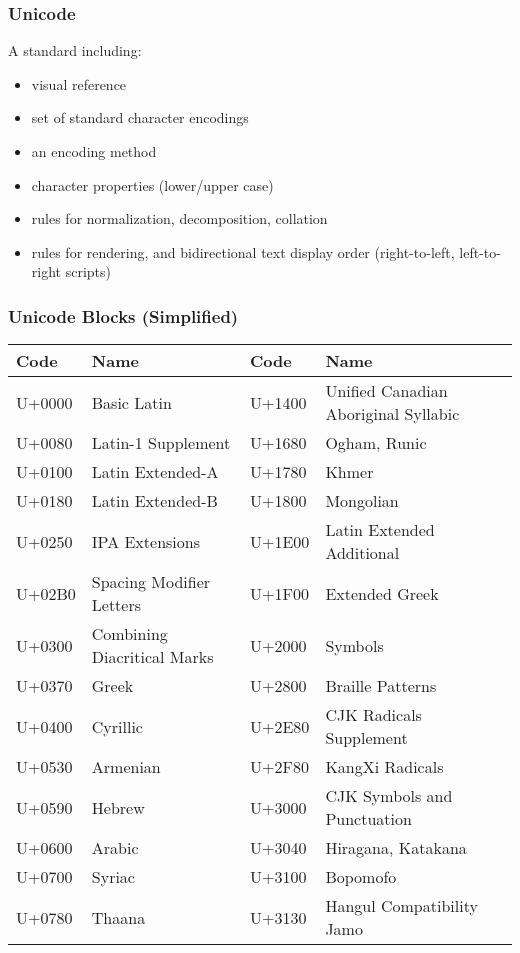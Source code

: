 \begin{frame}[fragile]
\frametitle{Unicode}
\color{structure}
A standard including:
\begin{itemize}\color{structure}
  \item visual reference
  \item set of standard character encodings
  \item an encoding method
  \item character properties (lower/upper case)
  \item rules for normalization, decomposition, collation
  \item rules for rendering, and bidirectional text display order (right-to-left, left-to-right scripts)
\end{itemize}
\end{frame}

\begin{frame}
\frametitle{Unicode Blocks (Simplified)}
\color{structure}
\begin{footnotesize}
\begin{table}
\begin{center}
\begin{tabular}{llll}
\hline
\textbf{Code}& \textbf{Name}& \textbf{Code}& \textbf{Name} \\
\hline
U+0000& Basic Latin& U+1400& Unified Canadian Aboriginal Syllabic \\
U+0080& Latin-1 Supplement& U+1680& Ogham, Runic \\
U+0100& Latin Extended-A& U+1780& Khmer \\
U+0180& Latin Extended-B& U+1800& Mongolian \\
U+0250& IPA Extensions& U+1E00& Latin Extended Additional \\
U+02B0& Spacing Modifier Letters& U+1F00& Extended Greek  \\
U+0300& Combining Diacritical Marks& U+2000& Symbols \\
U+0370& Greek& U+2800& Braille Patterns \\
U+0400& Cyrillic& U+2E80& CJK Radicals Supplement \\
U+0530& Armenian& U+2F80& KangXi Radicals \\
U+0590& Hebrew& U+3000& CJK Symbols and Punctuation \\
U+0600& Arabic& U+3040& Hiragana, Katakana \\
U+0700& Syriac& U+3100& Bopomofo \\
U+0780& Thaana& U+3130& Hangul Compatibility Jamo \\
\hline
\end{tabular}
\end{center}
\end{table}
\end{footnotesize}
\end{frame}


